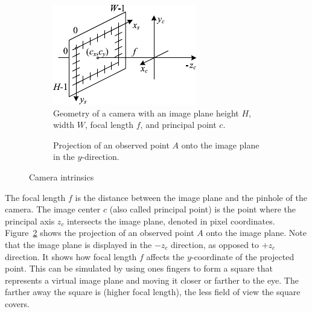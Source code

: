 \begin{figure}[ht!]
    \centering
    \begin{subfigure}[t]{0.45\textwidth} %
        \includegraphics[width=1\linewidth]{images/intrinsics}
        \caption{Geometry of a camera with an image plane height $H$, width $W$, focal length $f$, and principal point $c$.}
        \label{fig:intrinsics-3d}
    \end{subfigure}%
    \hspace{0.05\textwidth} %
    \begin{subfigure}[t]{0.45\textwidth} %
        \resizebox{\linewidth}{!}{
            
        }
        \caption{Projection of an observed point $A$ onto the image plane in the $y$-direction.}
        \label{fig:intrinsics-2d}
    \end{subfigure}%
    \caption{Camera intrinsics}
    \label{fig:intrinsics}
\end{figure}

The focal length $f$ is the distance between the image plane and the pinhole of the camera.
The image center $c$ (also called principal point) is the point where the principal axis $z_c$
intersects the image plane, denoted in pixel coordinates.
Figure~\ref{fig:intrinsics-2d} shows the projection of an observed point $A$ onto the image plane.
Note that the image plane is displayed in the $-z_c$ direction, as opposed to $+z_c$ direction.
It shows how focal length $f$ affects the $y$-coordinate of the projected point.
\cite{szeliski_computer_nodate, google_llc_arcore_doc, kris_kitani_computer_2017}
This can be simulated by using ones fingers to form a square that represents a virtual
image plane and moving it closer or farther to the eye.
The farther away the square is (higher focal length), the less field of view the square covers.

